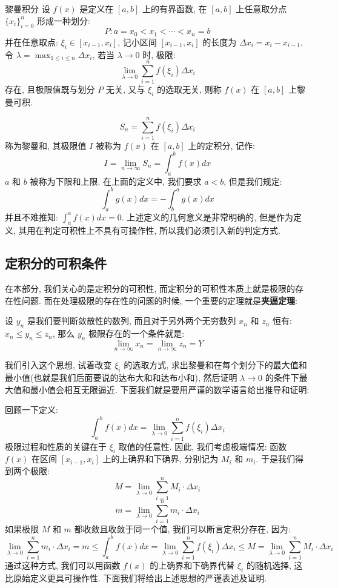 \documentclass[a4paper,12pt]{ctexart}
\begin{document}
\begin{mydef}{黎曼积分}{}
设 $f(x)$ 是定义在 $[a,b]$ 上的有界函数, 在 $[a,b]$ 上任意取分点 $\{ x_i \}_{i=0}^n$ 形成一种划分:
$$
P: a=x_0 < x_1 < \cdots < x_n = b
$$
并在任意取点: $\xi_i \in [x_{i-1},x_i]$, 记小区间 $[x_{i-1},x_i]$ 的长度为 $\Delta x_i = x_i - x_{i-1}$, 令 $\lambda = \max_{1 \le i \le n} \Delta x_i$, 若当 $\lambda \rightarrow 0$ 时, 极限:
$$
\lim_{\lambda \rightarrow 0} \sum_{i=1}^{n}f(\xi_i) \Delta x_i
$$
存在, 且极限值既与划分 $P$ 无关, 又与 $\xi_i$ 的选取无关, 则称 $f(x)$ 在 $[a,b]$ 上黎曼可积.
\end{mydef}

$$
S_n = \sum^{n}_{i=1} f(\xi_i) \Delta x_i
$$
称为黎曼和, 其极限值 $I$ 被称为 $f(x)$ 在 $[a,b]$ 上的定积分, 记作:
$$
I = \lim_{n \to \infty} S_n = \int_{a}^{b} f(x) dx
$$
$a$ 和 $b$ 被称为下限和上限. 在上面的定义中, 我们要求 $a < b$, 但是我们规定:
$$
\int_a^b g(x) dx = - \int_b^a g(x) dx
$$
并且不难推知: $\int_a^a f(x)dx = 0$. 上述定义的几何意义是非常明确的, 但是作为定义, 其用在判定可积性上不具有可操作性, 所以我们必须引入新的判定方式.

\subsection{定积分的可积条件}

在本部分, 我们关心的是定积分的可积性, 而定积分的可积性本质上就是极限的存在性问题. 而在处理极限的存在性的问题的时候, 一个重要的定理就是\textbf{夹逼定理}:

设 $y_n$ 是我们要判断敛散性的数列, 而且对于另外两个无穷数列 $x_n$ 和 $z_n$ 恒有: $x_n \le y_n \le z_n$, 那么 $y_n$ 极限存在的一个条件就是:
$$
\lim_{n \to \infty}x_n = \lim_{n \to \infty} z_n = Y
$$

我们引入这个思想, 试着改变 $\xi_i$ 的选取方式, 求出黎曼和在每个划分下的最大值和最小值(也就是我们后面要说的达布大和和达布小和), 然后证明 $\lambda \to 0$ 的条件下最大值和最小值会相互无限逼近. 下面我们就是要用严谨的数学语言给出推导和证明:

回顾一下定义: 
$$
\int_{a}^{b} f(x) dx =\lim_{\lambda \to 0} \sum_{i=1}^{n} f(\xi_i)\Delta x_i
$$
极限过程和性质的关键在于 $\xi_i$ 取值的任意性. 因此, 我们考虑极端情况: 函数 $f(x)$ 在区间 $[x_{i-1},x_i]$ 上的上确界和下确界, 分别记为 $M_i$ 和 $m_i$. 于是我们得到两个极限: 
$$
M = \lim_{\lambda \to 0} \sum_{i=1}^{n}M_i \cdot \Delta x_i
$$
$$
m = \lim_{\lambda \to 0} \sum_{i=1}^{n}m_i \cdot \Delta x_i
$$
如果极限 $M$ 和 $m$ 都收敛且收敛于同一个值, 我们可以断言定积分存在, 因为: 
$$
\lim_{\lambda \to 0} \sum_{i=1}^{n}m_i \cdot \Delta x_i = m \leq \int_{a}^{b} f(x) dx =\lim_{\lambda \to 0} \sum_{i=1}^{n} f(\xi_i)\Delta x_i \leq M = \lim_{\lambda \to 0} \sum_{i=1}^{n}M_i \cdot \Delta x_i
$$
通过这种方式, 我们可以用函数 $f(x)$ 的上确界和下确界代替 $\xi_i$ 的随机选择, 这比原始定义更具可操作性. 下面我们将给出上述思想的严谨表述及证明.
\end{document}

